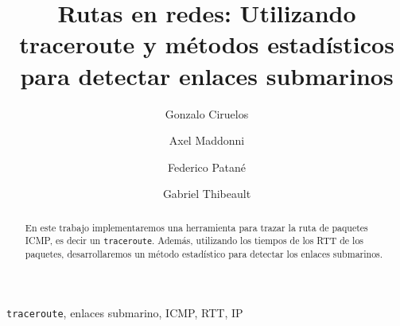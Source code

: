 \documentclass[%
	final, %
	notitlepage,
	narroweqnarray,
	inline,
	twoside,
	]{ieee}
\begin{document}
\title[Rutas en redes]{%
  Rutas en redes: Utilizando traceroute y m\'etodos estadísticos para detectar enlaces submarinos
}

\author[CIRUELOS, MADDONNI, PATAN\'E, THIBEAULT]{
Gonzalo Ciruelos %
\and{}Axel Maddonni %
\and{}Federico Patan\'e %
\and{}Gabriel Thibeault 
}



\maketitle               


\begin{abstract} 
  En este trabajo implementaremos una herramienta para trazar la ruta de paquetes ICMP, es decir un \texttt{traceroute}. Además, utilizando los tiempos de los RTT de los paquetes, desarrollaremos un m\'etodo estadístico para detectar los enlaces submarinos.
\end{abstract}

\begin{keywords}
  \texttt{traceroute}, enlaces submarino, ICMP, RTT, IP
\end{keywords}

















\end{document}
